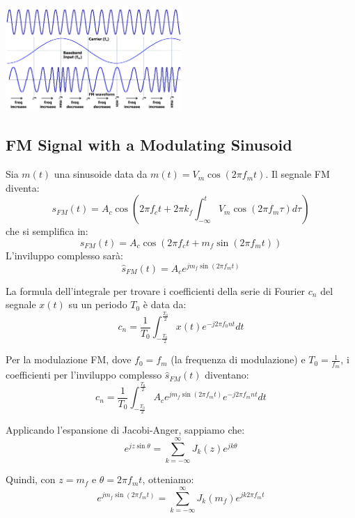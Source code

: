 \begin{center}
    \includegraphics[width=0.5\textwidth]{imgs/fm_mod.png}
\end{center}


\subsection*{FM Signal with a Modulating Sinusoid}

Sia \( m(t) \) una sinusoide data da \( m(t) = V_m \cos(2\pi f_m t) \). Il segnale FM diventa:
\[
s_{FM}(t) = A_c \cos \left( 2\pi f_c t + 2\pi k_f \int_{-\infty}^{t} V_m \cos(2\pi f_m \tau) d\tau \right)
\]
che si semplifica in:
\[
s_{FM}(t) = A_c \cos \left(2\pi f_c t + m_f \sin(2\pi f_m t) \right)
\]
L'inviluppo complesso sarà:
\[
\hat{s}_{FM}(t) = A_c e^{j m_f \sin(2\pi f_m t)}
\]





La formula dell'integrale per trovare i coefficienti della serie di Fourier \( c_n \) del segnale \( x(t) \) su un periodo \( T_0 \) è data da:
\[ c_n = \frac{1}{T_0} \int_{-\frac{T_0}{2}}^{\frac{T_0}{2}} x(t) e^{-j 2\pi f_0 n t} dt \]

Per la modulazione FM, dove \( f_0 = f_m \) (la frequenza di modulazione) e \( T_0 = \frac{1}{f_m} \), i coefficienti per l'inviluppo complesso \( \hat{s}_{FM}(t) \) diventano:
\[ c_n = \frac{1}{T_0} \int_{-\frac{T_0}{2}}^{\frac{T_0}{2}} A_c e^{j m_f \sin(2\pi f_m t)} e^{-j 2\pi f_m n t} dt \]

Applicando l'espansione di Jacobi-Anger, sappiamo che:
\[ e^{j z \sin \theta} = \sum_{k=-\infty}^\infty J_k(z) e^{j k \theta} \]

Quindi, con \( z = m_f \) e \( \theta = 2\pi f_m t \), otteniamo:
\[ e^{j m_f \sin(2\pi f_m t)} = \sum_{k=-\infty}^\infty J_k(m_f) e^{j k 2\pi f_m t} \]


